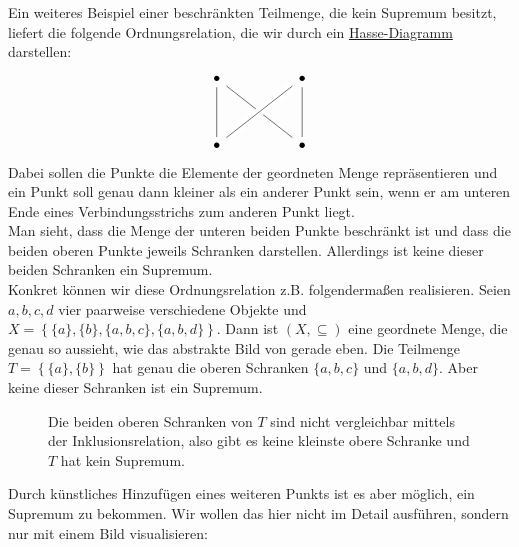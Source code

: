 \begin{bem}[*]
Ein weiteres Beispiel einer beschränkten Teilmenge, die kein Supremum besitzt, liefert die folgende Ordnungsrelation, die wir durch ein \href{https://de.wikipedia.org/wiki/Hasse-Diagramm}{Hasse-Diagramm} darstellen:
\[ \begin{tikzcd}
    \bullet \ar[rrdd, dash] && \bullet \ar[lldd, dash, crossing over]\\
    && \\
    \bullet \ar[uu, dash]  && \bullet \ar[uu, dash] 
   \end{tikzcd} \]
   Dabei sollen die Punkte die Elemente der geordneten Menge repräsentieren und ein Punkt soll genau dann kleiner als ein anderer Punkt sein, wenn er am unteren Ende eines Verbindungsstrichs zum anderen Punkt liegt. \\
   Man sieht, dass die Menge der unteren beiden Punkte beschränkt ist und dass die beiden oberen Punkte jeweils Schranken darstellen. Allerdings ist keine dieser beiden Schranken ein Supremum. \\[0.5em]
   Konkret können wir diese  Ordnungsrelation z.B. folgendermaßen realisieren. Seien $a,b,c,d$ vier paarweise verschiedene Objekte und $X=\left\{\{a\},\{b\},\{a,b,c\},\{a,b,d\}\right\}$. Dann ist $(X,\subseteq)$ eine geordnete Menge, die genau so aussieht, wie das abstrakte Bild von gerade eben. Die Teilmenge $T=\left\{\{a\},\{b\}\right\}$ hat genau die oberen Schranken $\{a,b,c\}$ und $\{a,b,d\}$. Aber keine dieser Schranken ist ein Supremum.
	\begin{figure}[H]
		\centering \caption{Die beiden oberen Schranken von $T$ sind nicht vergleichbar mittels der Inklusionsrelation, also gibt es keine kleinste obere Schranke und $T$ hat kein Supremum.}
	\end{figure}
Durch künstliches Hinzufügen eines weiteren Punkts ist es aber möglich, ein Supremum zu bekommen. Wir wollen das hier nicht im Detail ausführen, sondern nur mit einem Bild visualisieren:

\end{bem}
